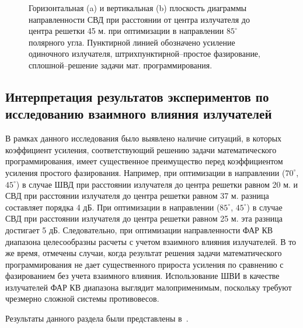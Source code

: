 \begin{figure}
\begin{minipage}[h]{0.49\linewidth}
\end{minipage}
\hfill
\begin{minipage}[h]{0.49\linewidth}
\end{minipage}
\caption{Горизонтальная (a) и вертикальная (b) плоскость диаграммы направленности СВД при расстоянии от центра излучателя до центра решетки 45 м. при оптимизации в направлении $85^{\circ}$ полярного угла. Пунктирной линией обозначено усиление одиночного излучателя, штрихпунктирной--простое фазирование, сплошной--решение задачи мат. программирования.}
\label{ris:svd_mut_5_85_45}
\end{figure}

\subsection{Интерпретация результатов экспериментов по исследованию взаимного влияния излучателей}
В рамках данного исследования было выявлено наличие ситуаций, в которых коэффициент усиления, соответствующий решению задачи математического программирования, имеет существенное преимущество перед коэффициентом усиления простого фазирования. Например, при оптимизации в направлении ($70^{\circ}$, $45^\circ$) в случае ШВД при расстоянии излучателя до центра решетки равном 20 м. и СВД при расстоянии излучателя до центра решетки равном 37 м. разница составляет порядка 4 дБ. При оптимизации в направлении ($85^\circ$, $45^{\circ}$) в случае СВД  при расстоянии излучателя до центра решетки равном 25 м. эта разница достигает 5 дБ. Следовательно, при оптимизации направленности ФАР КВ диапазона целесообразны расчеты с учетом взаимного влияния излучателей. В то же время, отмечены случаи, когда результат решения задачи математического программирования не дает существенного прироста усиления по сравнению с фазированием без учета взаимного влияния.
Использование ШВИ в качестве излучателей ФАР КВ диапазона выглядит малоприменимым, поскольку требуют чрезмерно сложной системы противовесов.

Результаты данного раздела были представлены в~\cite{tyu:jphys}.

